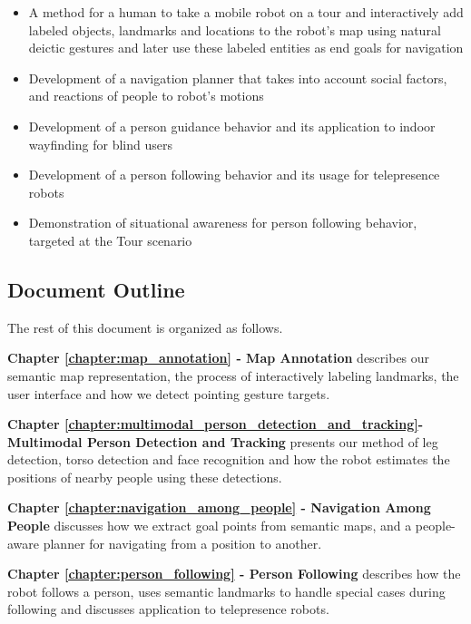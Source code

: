 \documentclass[12pt]{gatech-thesis}
\begin{document}
\begin{itemize}
\item A method for a human to take a mobile robot on a tour and interactively add labeled objects, landmarks and locations to the robot's map using natural deictic gestures and later use these labeled entities as end goals for navigation
\item Development of a navigation planner that takes into account social factors, and reactions of people to robot's motions
\item Development of a person guidance behavior and its application to indoor wayfinding for blind users
\item Development of a person following behavior and its usage for telepresence robots
\item Demonstration of situational awareness for person following behavior, targeted at the Tour scenario
\end{itemize}


\subsection{Document Outline}

The rest of this document is organized as follows.

\textbf{Chapter \ref{chapter:map_annotation} - Map Annotation} describes our semantic map representation, the process of interactively labeling landmarks, the user interface and how we detect pointing gesture targets.

\textbf{Chapter \ref{chapter:multimodal_person_detection_and_tracking}- Multimodal Person Detection and Tracking} presents our method of leg detection, torso detection and face recognition and how the robot estimates the positions of nearby people using these detections.

\textbf{Chapter \ref{chapter:navigation_among_people} - Navigation Among People} discusses how we extract goal points from semantic maps, and a people-aware planner for navigating from a position to another.

\textbf{Chapter \ref{chapter:person_following} - Person Following} describes how the robot follows a person, uses semantic landmarks to handle special cases during following and discusses application to telepresence robots.
\end{document}
